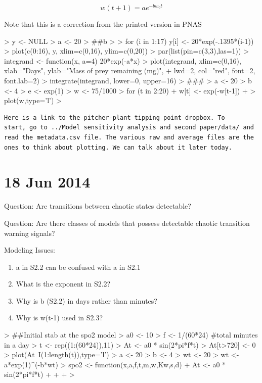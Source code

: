 \documentclass[12pt]{article}
\begin{document}
\begin{equation}
  w(t+1) = ae^{-bw_0t}
\end{equation}

Note that this is a correction from the printed version in PNAS

\begin{Schunk}
\begin{Sinput}
> y <- NULL
> a <- 20
> ##b
> 
> for (i in 1:17){ y[i] <- 20*exp(-.1395*(i-1))}
> plot(c(0:16), y, xlim=c(0,16), ylim=c(0,20))
> par(list(pin=c(3,3),las=1))
> integrand <- function(x, a=4) {20*exp(-a*x)}
> plot(integrand, xlim=c(0,16), xlab="Days", ylab="Mass of prey remaining (mg)",
+                      lwd=2, col="red", font=2, font.lab=2)
> integrate(integrand, lower=0, upper=16)
> ###
> a <- 20
> b <- 4
> e <- exp(1)
> w <- 75/1000
> for (t in 2:20){
+   w[t] <- exp(-w[t-1])
+ }
> plot(w,type='l')
> 
\end{Sinput}
\end{Schunk}

\begin{verbatim}
Here is a link to the pitcher-plant tipping point dropbox. To
start, go to ../Model sensitivity analysis and second paper/data/ and
read the metadata.csv file. The various raw and average files are the
ones to think about plotting. We can talk about it later today.
\end{verbatim}

\section{18 Jun 2014}

Question: Are transitions between chaotic states detectable?

Question: Are there classes of models that possess detectable chaotic
transition warning signals?

Modeling Issues:
\begin{enumerate}
\item a in S2.2 can be confused with a in S2.1
\item What is the exponent in S2.2?
\item Why is b (S2.2) in days rather than minutes?
\item Why is w(t-1) used in S2.3?
\end{enumerate}

\begin{Schunk}
\begin{Sinput}
>   ##Initial stab at the spo2 model
>   a0 <- 10
> f <- 1/(60*24) #total minutes in a day
> t <- rep((1:(60*24)),11)
> At <- a0 * sin(2*pi*f*t)
> At[t>720] <- 0
> plot(At~I(1:length(t)),type='l')
> a <- 20
> b <- 4
> wt <- 20
> wt <- a*exp(1)^(-b*wt)
> spo2 <- function(x,a,f,t,m,w,Kw,s,d){
+   At <- a0 * sin(2*pi*f*t)
+   
+   
+ }
> 
\end{Sinput}
\end{Schunk}
\end{document}
